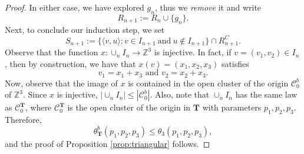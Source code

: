 \documentclass[10pt,a4paper]{amsart}
\newcommand{\Z}{\mathbb{Z}}
\begin{document}
\begin{proof}
In either case, we have explored $g_n$, thus we \textit{remove} it and write
\[ R_{n+1} := R_n \cup \{ g_n \}.\]
Next, to conclude our induction step, we set
\begin{equation*}
  S_{n+1} := \{ \langle v, u \rangle : v \in I_{n+1} \: \mbox{and} \: u \notin I_{n+1} \} \cap R_{n+1}^C.
\end{equation*}
Observe that the function $x: \cup_n I_n \longrightarrow \Z^{3}$ is injective.  
In fact, if $v= (v_1, v_2) \in I_n$, then by construction, we have that $x(v) = (x_1,x_2,x_3)$ satisfies
\[ v_1=x_1+x_3 \mbox{ and }
    v_2=x_2+x_3.\]
Now, observe that the image of $x$ is contained in the  open cluster of the origin $\mathcal{C}^b_0$ of $\Z^{3}$. Since $x$ is injective,  $|\cup_n I_n| \leq |\mathcal{C}^b_0|$.  Also, note that $\cup_{n} I_n$ has the same  law as  $\mathcal{C}^{\mathbf{T}}_0$, where $\mathcal{C}^{\mathbf{T}}_0$ is the  open cluster of the origin in $\mathbf{T}$ with parameters $p_1, p_2,p_3$.  Therefore,
\begin{equation*}
 \theta^b_{\mathbf{T}}(p_1,p_2,p_3) \leq \theta_{3}(p_1,p_2,p_3),
\end{equation*}
and the proof of Proposition \ref{prop:triangular} follows.
\end{proof}
\end{document}
